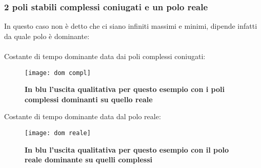 \documentclass[a4paper]{article}
\begin{document}
	\subsubsection*{2 poli stabili complessi coniugati e un polo reale}
	In questo caso non è detto che ci siano infiniti massimi e minimi, dipende infatti da quale polo è dominante:
	\\\\Costante di tempo dominante data dai poli complessi coniugati:
	\begin{figure}[H]
		\centering
		\texttt{[image: dom compl]}
		\caption{\textbf{In blu l'uscita qualitativa per questo esempio con i poli complessi dominanti su quello reale}}
	\end{figure}
	Costante di tempo dominante data dal polo reale:
	\begin{figure}[H]
		\centering
		\texttt{[image: dom reale]}
		\caption{\textbf{In blu l'uscita qualitativa per questo esempio con il polo reale dominante su quelli complessi}}\label{complessi non dominanti}
	\end{figure}
\end{document}
